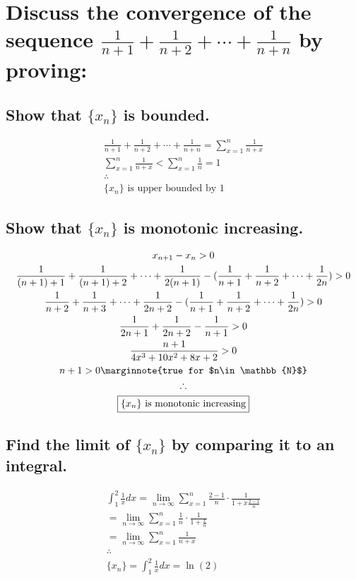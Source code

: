 \documentclass[letterpaper]{article}
\begin{document}
\section{Discuss the convergence of the sequence $\frac{1}{n+1}+\frac{1}{n+2}+\dotsb+\frac{1}{n+n}$ by proving:}
\subsection{Show that $\{x_n\}$ is bounded.}
\begin{gather*}
\frac{1}{n+1}+\frac{1}{n+2}+\dotsb+\frac{1}{n+n}=\sum_{x=1}^{n}\frac{1}{n+x} \\
\sum_{x=1}^{n}\frac{1}{n+x}<\sum_{x=1}^{n}\frac{1}{n}=1 \\
\therefore \\
\boxed{\{x_n\}\text{ is upper bounded by }1}
\end{gather*}
\subsection{Show that $\{x_n\}$ is monotonic increasing.}
\begin{gather*}
x_{n+1}-x_n>0 \\
\frac{1}{(n+1)+1}+\frac{1}{(n+1)+2}+\dotsb+\frac{1}{2(n+1)}-(\frac{1}{n+1}+\frac{1}{n+2}+\dotsb+\frac{1}{2n})>0 \\
\frac{1}{n+2}+\frac{1}{n+3}+\dotsb+\frac{1}{2n+2}-(\frac{1}{n+1}+\frac{1}{n+2}+\dotsb+\frac{1}{2n})>0 \\
\frac{1}{2n+1}+\frac{1}{2n+2}-\frac{1}{n+1}>0 \\
\frac{n+1}{4x^3+10x^2+8x+2}>0 \\
n+1>0 \marginnote{true for $n\in\mathbb{N}$} \\
\therefore \\
\boxed{\{x_n\} \text{ is monotonic increasing}}
\end{gather*}
\subsection{Find the limit of $\{x_n\}$ by comparing it to an integral.}
\begin{gather*}
\int_{1}^{2}\frac{1}{x}dx=\lim_{n\rightarrow\infty}\sum_{x=1}^{n}\frac{2-1}{n}\cdot\frac{1}{1+x\frac{2-1}{n}} \\
=\lim_{n\rightarrow\infty}\sum_{x=1}^{n}\frac{1}{n}\cdot\frac{1}{1+\frac{x}{n}} \\
=\lim_{n\rightarrow\infty}\sum_{x=1}^{n}\frac{1}{n+x} \\
\therefore \\
\boxed{\{x_n\}=\int_{1}^{2}\frac{1}{x}dx=\ln(2)}
\end{gather*}
\end{document}
